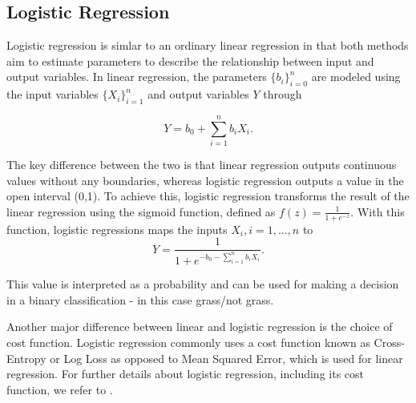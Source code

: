 \subsection{Logistic Regression}
Logistic regression is simlar to an ordinary linear regression in that both methods aim to estimate parameters to describe the relationship between input and output variables. In linear regression, the parameters $\{b_i\}_{i=0}^n$ are modeled using the input variables $\{X_i\}_{i=1}^n$ and output variables $Y$ through

\begin{equation}
	Y= b_0+\sum_{i=1}^n b_iX_i.
\end{equation}

The key difference between the two is that linear regression outputs continuous values without any boundaries, whereas logistic regression outputs a value in the open interval (0,1).  To achieve this, logistic regression transforms the result of the linear regression using the sigmoid function, defined as $f(z)=\frac{1}{1+e^{-z}}$. With this function, logistic regressions maps the inputs $X_i, i=1,...,n$ to
\begin{equation}
	Y= \frac{1}{1+e^{-b_0-\sum_{i=1}^n b_iX_i}}.
\end{equation}

This value is interpreted as a probability and can be used for making a decision in a binary classification - in this case grass/not grass.

Another major difference between linear and logistic regression is the choice of cost function. Logistic regression commonly uses a cost function known as Cross-Entropy or Log Loss as opposed to Mean Squared Error, which is used for linear regression. For further details about logistic regression, including its cost function, we refer to \citep{a_smola_svn_vishwanathan_2010}.

